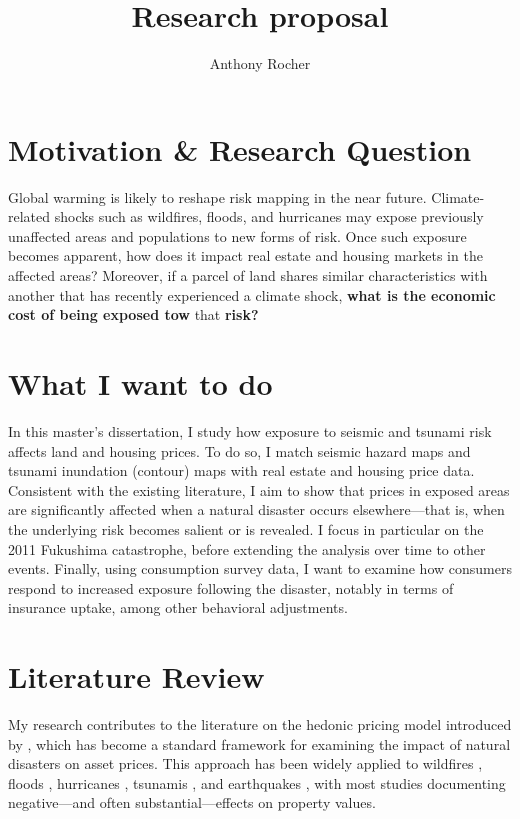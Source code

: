 \documentclass{article}
\title{Research proposal}
\author{Anthony Rocher}
\date{}
\begin{document}
\maketitle


\section{Motivation \& Research Question}

Global warming is likely to reshape risk mapping in the near future. Climate-related shocks such as wildfires, floods, and hurricanes may expose previously unaffected areas and populations to new forms of risk. Once such exposure becomes apparent, how does it impact real estate and housing markets in the affected areas? Moreover, if a parcel of land shares similar characteristics with another that has recently experienced a climate shock, \textbf{what is the economic cost of being exposed tow} that \textbf{risk?}


\section{What I want to do}

In this master’s dissertation, I study how exposure to seismic and tsunami risk affects land and housing prices. To do so, I match seismic hazard maps and tsunami inundation (contour) maps with real estate and housing price data. Consistent with the existing literature, I aim to show that prices in exposed areas are significantly affected when a natural disaster occurs elsewhere—that is, when the underlying risk becomes salient or is revealed. I focus in particular on the 2011 Fukushima catastrophe, before extending the analysis over time to other events. Finally, using consumption survey data, I want to examine how consumers respond to increased exposure following the disaster, notably in terms of insurance uptake, among other behavioral adjustments.


\section{Literature Review}

My research contributes to the literature on the hedonic pricing model introduced by \cite{rosen_hedonic_1974}, which has become a standard framework for examining the impact of natural disasters on asset prices. This approach has been widely applied to wildfires \citep{lopez_wildfire_2025}, floods \citep{bin_effects_2004, atreya_forgetting_2013, atreya_seeing_2015, li_flood_2018}, hurricanes \citep{fisher_impact_2021, meltzer_sandy_2021}, tsunamis \citep{sato_impact_2021}, and earthquakes \citep{brookshire_test_1985, beron_analysis_1997, naoi_earthquake_2009, ikefuji_earthquake_2022}, with most studies documenting negative—and often substantial—effects on property values.
\end{document}
